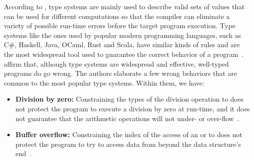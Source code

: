 \documentclass[
  oneside,
  english,
  coorientadorbanca,
  noabntexcite
]{ufsc-thesis-rn46-2019}
\newcommand{\codett}[1]{\text{\scpfamily#1}}
\begin{document}
According to \textcite{jhala2020tutorial}, type systems are mainly used to describe valid sets of values that can be used for different computations so that the compiler can eliminate a variety of possible run-time errors before the target program execution.
Type systems like the ones used by popular modern programming languages, such as C\#, Haskell, Java, OCaml, Rust and Scala, have similar kinds of rules and are the most widespread tool used to guarantee the correct behavior of a program~\cite{jhala2020tutorial}.
\textcite{jhala2020tutorial} affirm that, although type systems are widespread and effective, well-typed programs do go wrong.
The authors elaborate a few wrong behaviors that are common to the most popular type systems. Within them, we have:
\begin{itemize}
  \item \textbf{Division by zero:} Constraining the types of the division operation to \codett{Int} does not protect the program to execute a division by zero at run-time, and it does not guarantee that the arithmetic operations will not under- or over-flow~\cite{jhala2020tutorial}.
  \item \textbf{Buffer overflow:} Constraining the index of the access of an \codett{Array} or \codett{String} to \codett{Int} does not protect the program to try to access data from beyond the data structure's end~\cite{jhala2020tutorial}.
\end{itemize}
\end{document}
